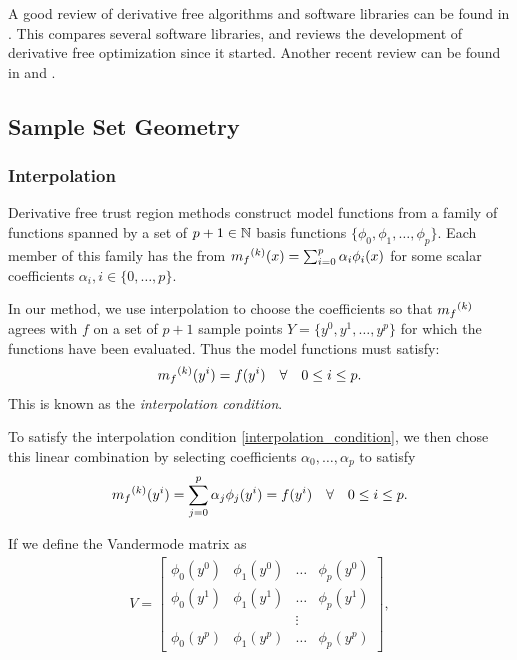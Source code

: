 A good review of derivative free algorithms and software libraries can be found in \cite{DUMMY:review}.
This compares several software libraries, and reviews the development of derivative free optimization since it started.
Another recent review can be found in \cite{DUMMY:review2} and \cite{Larson_2019}.



\subsection{Sample Set Geometry}
\subsubsection{Interpolation}
\label{interpolation}

Derivative free trust region methods construct model functions from a family of functions spanned by a set of $p + 1 \in \mathbb N$ basis functions  $\{\phi_0, \phi_1, \ldots, \phi_p\}$.
Each member of this family has the from ${{m}_f}^{(k)}(x) = \sum_{i=0}^p\alpha_i\phi_i(x)$ for some scalar coefficients $\alpha_i, i \in \{0, \ldots, p\}$.

In our method, we use interpolation to choose the coefficients so that ${{m}_f}^{(k)}$ agrees with $f$ on a set of $p+1$ sample points $Y = \{y^0, y^1, \ldots, y^p\}$ for which the functions have been evaluated.
Thus the model functions must satisfy:
\begin{align}
\label{interpolation_condition}
{{m}_f}^{(k)}(y^i) = f(y^i) \quad \forall \quad 0 \le i \le p.
\end{align}
This is known as the \emph{interpolation condition}.

To satisfy the interpolation condition \cref{interpolation_condition}, we then chose this linear combination by selecting coefficients $\alpha_0, \ldots, \alpha_p$ to satisfy
\begin{align}
\label{interpolation_formula}
    {{m}_f}^{(k)}(y^i) = \sum^p_{j=0}\alpha_j\phi_j(y^i) = f(y^i) \quad \forall \quad 0 \le i \le p.
\end{align}

If we define the Vandermode matrix as
\begin{align}
\label{vandermonde}
V=
\begin{bmatrix}
    \phi_0(y^0)      & \phi_1(y^0)       & \ldots & \phi_{p}(y^0)      \\
    \phi_0(y^1)      & \phi_1(y^1)       & \dots  & \phi_{p}(y^1)      \\
                     &                   & \vdots &                    \\
    \phi_0(y^{p})    & \phi_1(y^{p})     & \ldots & \phi_{p}(y^{p})
\end{bmatrix},
\end{align}

